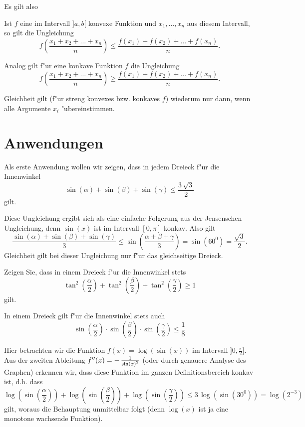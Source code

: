 \documentclass[11pt]{article}
\begin{document}
Es gilt also 
\begin{satz}  Ist $f$ eine im Intervall
$]a,b[$ konvexe Funktion und $x_1,\ldots,x_n$ aus diesem Intervall, so
gilt die Ungleichung
\[f\left(\frac{x_1+x_2+\ldots+x_n}{n}\right)\leq \frac{f(x_1)+f(x_2)
+\ldots +f(x_n)}{n}.\]

Analog gilt f"ur eine konkave Funktion $f$ die Ungleichung
\[f\left(\frac{x_1+x_2+\ldots+x_n}{n}\right)\geq \frac{f(x_1)+f(x_2)
+\ldots +f(x_n)}{n}.\] 

Gleichheit gilt (f"ur streng konvexes bzw. konkaves $f$) wiederum nur
dann, wenn alle Argumente $x_i$ "ubereinstimmen.
\end{satz}

\section{Anwendungen}

Als erste Anwendung wollen wir zeigen, dass in jedem Dreieck f"ur die
Innenwinkel 
\[\sin(\alpha)+\sin(\beta)+\sin(\gamma)\leq \frac{3\,\sqrt{3}}{2}\]
gilt.

Diese Ungleichung ergibt sich als eine einfache Folgerung aus der
Jensenschen Ungleichung, denn $\sin(x)$ ist im Intervall $[0,\pi]$
konkav. Also gilt
\[\frac{\sin(\alpha)+\sin(\beta)+\sin(\gamma)}{3}\leq
\sin\left(\frac{\alpha +\beta +\gamma}{3} \right) =\sin(60^0) =
\frac{\sqrt{3}}{2}.\] Gleichheit gilt bei dieser Ungleichung nur f"ur
das gleichseitige Dreieck.

\begin{aufgabe}
 Zeigen Sie, dass in einem Dreieck f"ur die Innenwinkel stets
\[\tan^2(\frac{\alpha}{2})+ \tan^2(\frac{\beta}{2})+
\tan^2(\frac{\gamma}{2}) \geq 1\]
gilt.
\end{aufgabe}

In einem Dreieck gilt f"ur die Innenwinkel stets auch 
\[\sin(\frac{\alpha}{2}) \cdot\sin(\frac{\beta}{2})
\cdot\sin(\frac{\gamma}{2}) \leq \frac{1}{8}\]

Hier betrachten wir die Funktion $f(x)=\log(\sin(x))$ im Intervall
$]0, \frac{\pi}{2}]$. Aus der zweiten Ableitung $f''(x)= -\,
\frac{1}{{{\rm sin}(x)}^{2}}$ (oder durch genauere Analyse des
Graphen) erkennen wir, dass diese Funktion im ganzen
Definitionsbereich konkav ist, d.h. dass
\[\log(\sin(\frac{\alpha}{2}))+\log(\sin(\frac{\beta}{2})) +
\log(\sin(\frac{\gamma}{2})) \leq 3\, \log(\sin(30^0)) =
\log(2^{-3})
\] 
gilt, woraus die Behauptung unmittelbar folgt (denn $\log(x)$ ist ja
eine monotone wachsende Funktion).
\medskip
\end{document}
